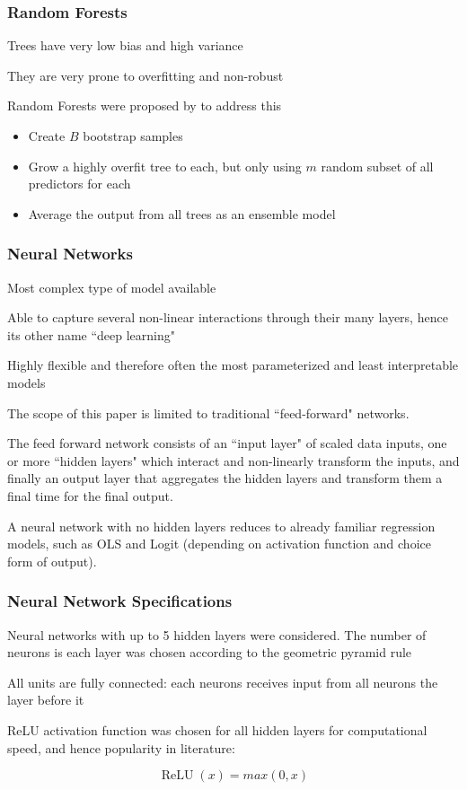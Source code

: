 \documentclass[]{beamer}
\begin{document}
\begin{frame}
\frametitle{Random Forests}
Trees have very low bias and high variance

They are very prone to overfitting and non-robust

Random Forests were proposed by \cite{breiman_random_2001} to address this
\begin{itemize}
	\item Create $B$ bootstrap samples
	\item Grow a highly overfit tree to each, but only using $m$ random subset of all predictors for each
	\item Average the output from all trees as an ensemble model
\end{itemize}
\end{frame}


\begin{frame}
\frametitle{Neural Networks}
Most complex type of model available

Able to capture several non-linear interactions through their many layers, hence its other name ``deep learning" 

Highly flexible and therefore often the most parameterized and least interpretable models

The scope of this paper is limited to traditional ``feed-forward" networks. 
\end{frame}

\begin{frame}
The feed forward network consists of an ``input layer" of scaled data inputs, one or more ``hidden layers" which interact and non-linearly transform the inputs, and finally an output layer that aggregates the hidden layers and transform them a final time for the final output. 

A neural network with no hidden layers reduces to already familiar regression models, such as OLS and Logit (depending on activation function and choice form of output).

\end{frame}

\begin{frame}
\frametitle{Neural Network Specifications}
Neural networks with up to 5 hidden layers were considered. The number of neurons is each layer was chosen according to the geometric pyramid rule \citep{masters_practical_1993}

All units are fully connected: each neurons receives input from all neurons the layer before it

ReLU activation function was chosen for all hidden layers for computational speed, and hence popularity in literature:

\begin{equation}
\operatorname{ReLU}(x) = max(0, x)
\end{equation}
\end{frame}
\end{document}
